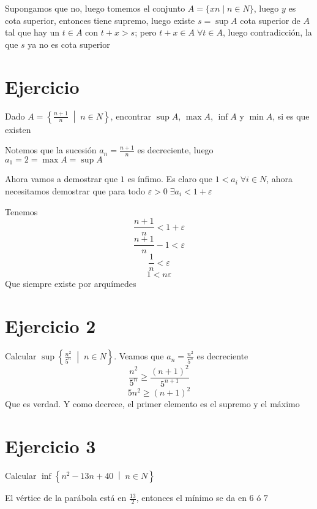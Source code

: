 \documentclass{article}
\begin{document}
Supongamos que no, luego tomemos el conjunto $A = \{xn \mid n \in N\}$, luego $y$ es cota
superior, entonces tiene supremo, luego existe $s = \sup A$ cota superior de $A$
tal que hay un $t \in A$
con $t + x > s$; pero $t + x \in A \;\forall t \in A$, luego contradicción, la que $s$
ya no es cota superior

\section{Ejercicio}
Dado $A = \left\{\frac{n+1}{n} \;\middle|\; n \in N \right\}$, encontrar $\sup A$, $\max A$, $\inf A$ y $\min A$, si es que existen

Notemos que la sucesión $a_n = \frac{n+1}{n}$ es decreciente, luego $a_1 = 2 = \max A = \sup A$

Ahora vamos a demostrar que $1$ es ínfimo. Es claro que $1 < a_i \; \forall i \in N$, ahora necesitamos demostrar que para todo $\varepsilon > 0 \; \exists a_i < 1 + \varepsilon$

Tenemos
\[\frac{n+1}{n} < 1 + \varepsilon\]
\[\frac{n+1}{n} - 1 < \varepsilon\]
\[\frac{1}{n} < \varepsilon\]
\[1 < n\varepsilon\]
Que siempre existe por arquímedes

\section{Ejercicio 2}
Calcular $\sup \left\{\frac{n^2}{5^n} \;\middle|\; n \in N\right\}$.
Veamos que $a_n = \frac{n^2}{5^n}$ es decreciente
\[\frac{n^2}{5^n} \ge \frac{(n+1)^2}{5^{n+1}}\]
\[5n^2 \ge (n+1)^2\]
Que es verdad. Y como decrece, el primer elemento es el supremo y el máximo

\section{Ejercicio 3}
Calcular $\inf \left\{n^2 - 13n + 40 \;\middle|\; n \in N\right\}$

El vértice de la parábola está en $\frac{13}{2}$, entonces el mínimo se da en $6$ ó $7$
\end{document}
